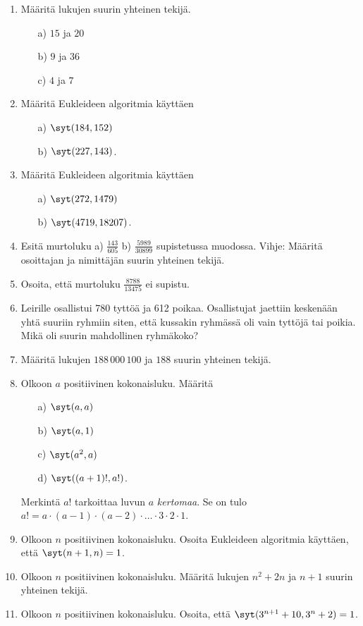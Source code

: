 \begin{enumerate}

\item Määritä lukujen suurin yhteinen tekijä.
\begin{itemize}
\item[a)] $15$ ja $20$
\item[b)] $9$ ja $36$
\item[c)] $4$ ja $7$
\end{itemize}

\item Määritä Eukleideen algoritmia käyttäen
\begin{itemize}
\item[a)] $\syt(184,152)$
\item[b)] $\syt(227,143)$.
\end{itemize}

\item Määritä Eukleideen algoritmia käyttäen
\begin{itemize}
\item[a)] $\syt(272,1479)$
\item[b)] $\syt(4719,18207)$.
\end{itemize}

\item Esitä murtoluku  a) $\frac{143}{605}$  b) $\frac{5989}{30899}$  supistetussa muodossa. Vihje: Määritä osoittajan ja nimittäjän suurin yhteinen tekijä.

\item Osoita, että murtoluku $\frac{8788}{13475}$ ei supistu.

\item Leirille osallistui 780 tyttöä ja 612 poikaa. Osallistujat jaettiin keskenään yhtä suuriin ryhmiin siten, että kussakin ryhmässä oli vain tyttöjä tai poikia. Mikä oli suurin mahdollinen ryhmäkoko?

\item
Määritä lukujen $188\, 000\, 100$ ja $188$ suurin yhteinen tekijä.

\item Olkoon $a$ positiivinen kokonaisluku. Määritä
\begin{itemize}
\item[a)] $\syt(a,a)$
\item[b)] $\syt(a,1)$
\item[c)] $\syt(a^2,a)$
\item[d)] $\syt((a+1)!,a!)$.
\end{itemize}
Merkintä $a!$ tarkoittaa luvun $a$ {\em kertomaa}. Se on tulo $a! = a \cdot (a-1) \cdot (a-2) \cdot \ldots \cdot 3 \cdot 2 \cdot 1$.

\item Olkoon $n$ positiivinen kokonaisluku. Osoita Eukleideen algoritmia käyttäen, että $\syt(n+1,n)=1$.

\item Olkoon $n$ positiivinen kokonaisluku. Määritä lukujen $n^2 + 2n$ ja $n + 1$ suurin yhteinen tekijä.

\item Olkoon $n$ positiivinen kokonaisluku. Osoita, että $\syt(3^{n+1} + 10,3^n + 2)=1$.

\end{enumerate}

